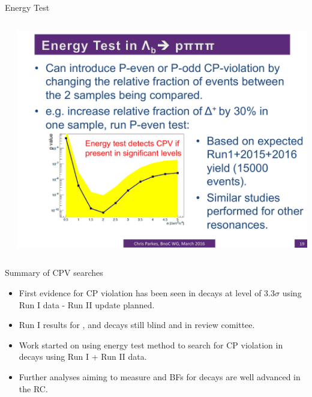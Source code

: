 \documentclass{beamer}
\begin{document}
\begin{frame}{Energy Test}
\begin{columns}
\begin{column}{.49\textwidth}
\begin{itemize}
      \end{itemize}
    \end{column}
    \begin{column}{.49\textwidth}
      \includegraphics[width=\textwidth]{SPVSensitivity.pdf}
    \end{column}
  \end{columns}
\end{frame}

\begin{frame}{Summary of  CPV searches}
  \begin{itemize}
  \item First evidence for CP violation has been seen in \decay{\Lb}{\proton \pim \pip \pim} decays at level of $3.3\sigma$ using Run I data - Run II update planned.
  \item Run I results for \decay{\Lb}{\proton \Km \pip \pim}, \decay{\Lb}{\proton \Km \Kp \Km} and  decays still blind and in review comittee.
  \item Work started on using energy test method to search for CP violation in \decay{\Lb}{\proton \pim \pip \pim} decays using Run I + Run II data.
  \item Further analyses aiming to measure \ACP and BFs for  decays are well advanced in the RC.
  \end{itemize}
\end{frame}
\end{document}
